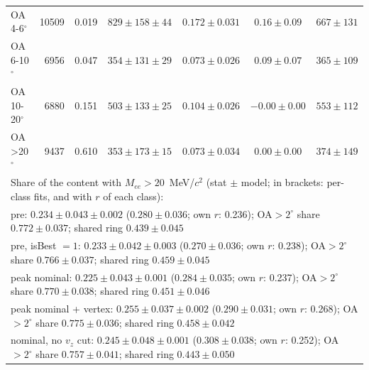 \begin{table}[H]
\begin{tabular}{lrrcccc}
OA 4-6$^\circ$ & 10509 & 0.019 & $829\pm158\pm44$ & $0.172\pm0.031$ & $0.16\pm0.09$ & $667\pm131$ \\
OA 6-10$^\circ$ & 6956 & 0.047 & $354\pm131\pm29$ & $0.073\pm0.026$ & $0.09\pm0.07$ & $365\pm109$ \\
OA 10-20$^\circ$ & 6880 & 0.151 & $503\pm133\pm25$ & $0.104\pm0.026$ & $-0.00\pm0.00$ & $553\pm112$ \\
OA >20$^\circ$ & 9437 & 0.610 & $353\pm173\pm15$ & $0.073\pm0.034$ & $0.00\pm0.00$ & $374\pm149$ \\
\midrule
\multicolumn{7}{p{0.93\textwidth}}{Share of the content with $M_{ee}>20$~MeV/$c^2$ (stat $\pm$ model; in brackets: per-class fits, and with $r$ of each class):} \\
\multicolumn{7}{p{0.93\textwidth}}{\quad pre: $0.234\pm0.043\pm0.002$ ($0.280\pm0.036$; own $r$: 0.236); OA$>2^\circ$ share $0.772\pm0.037$; shared ring $0.439\pm0.045$} \\
\multicolumn{7}{p{0.93\textwidth}}{\quad pre, isBest $=1$: $0.233\pm0.042\pm0.003$ ($0.270\pm0.036$; own $r$: 0.238); OA$>2^\circ$ share $0.766\pm0.037$; shared ring $0.459\pm0.045$} \\
\multicolumn{7}{p{0.93\textwidth}}{\quad peak nominal: $0.225\pm0.043\pm0.001$ ($0.284\pm0.035$; own $r$: 0.237); OA$>2^\circ$ share $0.770\pm0.038$; shared ring $0.451\pm0.046$} \\
\multicolumn{7}{p{0.93\textwidth}}{\quad peak nominal + vertex: $0.255\pm0.037\pm0.002$ ($0.290\pm0.031$; own $r$: 0.268); OA$>2^\circ$ share $0.775\pm0.036$; shared ring $0.458\pm0.042$} \\
\multicolumn{7}{p{0.93\textwidth}}{\quad nominal, no $v_z$ cut: $0.245\pm0.048\pm0.001$ ($0.308\pm0.038$; own $r$: 0.252); OA$>2^\circ$ share $0.757\pm0.041$; shared ring $0.443\pm0.050$} \\
\bottomrule
\end{tabular}
\end{table}
